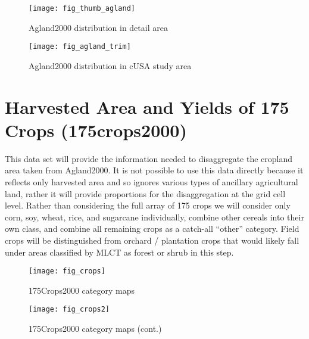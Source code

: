 
\begin{figure}[htp]
\centering
  

\texttt{[image: fig\_thumb\_agland]}
 
\caption{Agland2000 distribution in detail area}
\label{fig:thumb_agland} 
\end{figure} 

\begin{figure}[htp]
\centering
  


\texttt{[image: fig\_agland\_trim]}
 
\caption{Agland2000 distribution in cUSA study area}
\label{fig:agland} 
\end{figure} 

\clearpage

\section{Harvested Area and Yields of 175 Crops (175crops2000)}
\label{sec:175crops2000}

\citet{Monfreda2008}




This data set will provide the information needed to disaggregate the
cropland area taken from Agland2000.  It is not possible to use this
data directly because it reflects only harvested area and so ignores
various types of ancillary agricultural land, rather it will provide
proportions for the disaggregation at the grid cell level.  Rather
than considering the full array of 175 crops we will consider only
corn, soy, wheat, rice, and sugarcane individually, combine other
cereals into their own class, and combine all remaining crops as a
catch-all ``other'' category.  Field crops will be distinguished from
orchard / plantation crops that would likely fall under areas
classified by MLCT as forest or shrub in this step.



\begin{figure}[htp] 
  \centering


\texttt{[image: fig\_crops]}
\caption{175Crops2000 category maps} 
\label{fig:crops} 
\end{figure} 


\begin{figure}[htp] 
  \centering


\texttt{[image: fig\_crops2]}
\caption{175Crops2000 category maps (cont.)} 
\label{fig:crops2} 
\end{figure} 


